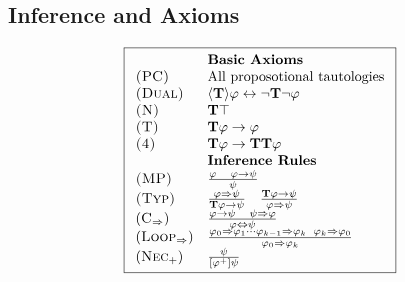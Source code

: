 \documentclass[letterpaper]{article}
\theoremstyle{definition}
\newcommand{\Typ}{\textrm{\textup{\textbf{T}}}}
\newcommand{\axiom}{\textsc}
\begin{document}
\subsection{Inference and Axioms}


\begin{figure}[ht!]
\begin{equation*}
\boxed{
\begin{array}{ll}
    & \textbf{Basic Axioms}\\
    
    \axiom{(PC)} & \mbox{All proposotional tautologies}\\

    \axiom{(Dual)} & \langle \Typ \rangle \varphi \leftrightarrow \neg \Typ \neg \varphi\\
    
    \axiom{(N)} & \Typ \top\\
    
    \axiom{(T)} & \Typ \varphi \to \varphi\\
    
    \axiom{(4)} & \Typ \varphi \to \Typ \Typ \varphi\\
    
    & \textbf{Inference Rules}\\

    \axiom{(MP)} & \frac{\varphi \quad \varphi \to \psi}{\psi} \\
    
    \axiom{(Typ)} & \frac{\varphi \Rightarrow \psi}{\Typ \varphi \to \psi} \quad \frac{\Typ \varphi \to \psi}{\varphi \Rightarrow \psi} \\

    
    (\axiom{C}_\Rightarrow) & \frac{\varphi \to \psi \quad \psi \Rightarrow \varphi}{\varphi \Leftrightarrow \psi} \\
    
    (\axiom{Loop}_\Rightarrow) & 
    \frac{\varphi_0 \Rightarrow \varphi_1
    \cdots
    \varphi_{k-1} \Rightarrow \varphi_k \enskip
    \varphi_k \Rightarrow \varphi_0}
    {\varphi_0 \Rightarrow \varphi_k} \\
    
    (\axiom{Nec}_+) & \frac{\psi}{[\varphi^+] \psi} \\
    

\end{array}}
\end{equation*}
\end{figure}
\end{document}
